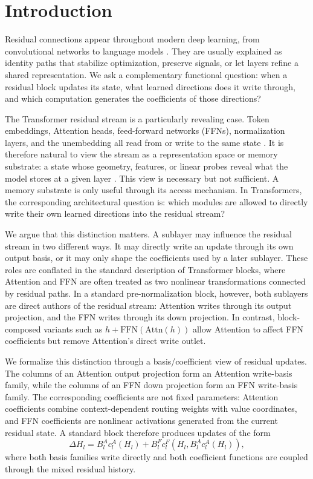 \documentclass[letterpaper]{article}
\newcommand{\Attn}{\mathrm{Attn}}
\newcommand{\FFN}{\mathrm{FFN}}
\newcommand{\BA}{B^{A}}
\newcommand{\BF}{B^{F}}
\newcommand{\ca}{c^{A}}
\newcommand{\cf}{c^{F}}
\begin{document}
\section{Introduction}

Residual connections appear throughout modern deep learning, from convolutional
networks to language models \citep{he2016identity,vaswani2017attention}. They
are usually explained as identity paths that stabilize optimization, preserve
signals, or let layers refine a shared representation. We ask a complementary
functional question: when a residual block updates its state, what learned
directions does it write through, and which computation generates the
coefficients of those directions?

The Transformer residual stream is a particularly revealing case. Token
embeddings, Attention heads, feed-forward networks (FFNs), normalization
layers, and the unembedding all read from or write to the same state
\citep{vaswani2017attention,elhage2021framework}. It is therefore natural to
view the stream as a representation space or memory substrate: a state whose
geometry, features, or linear probes reveal what the model stores at a given
layer \citep{nostalgebraist2020logit,belrose2023tuned}. This view is necessary
but not sufficient. A memory substrate is only useful through its access
mechanism. In Transformers, the corresponding architectural question is: which
modules are allowed to directly write their own learned directions into the
residual stream?

We argue that this distinction matters. A sublayer may influence the residual
stream in two different ways. It may directly write an update through its own
output basis, or it may only shape the coefficients used by a later sublayer.
These roles are conflated in the standard description of Transformer blocks,
where Attention and FFN are often treated as two nonlinear transformations
connected by residual paths. In a standard pre-normalization block, however,
both sublayers are direct authors of the residual stream: Attention writes
through its output projection, and the FFN writes through its down projection.
In contrast, block-composed variants such as $h+\FFN(\Attn(h))$ allow
Attention to affect FFN coefficients but remove Attention's direct write
outlet.

We formalize this distinction through a basis/coefficient view of residual
updates. The columns of an Attention output projection form an Attention
write-basis family, while the columns of an FFN down projection form an FFN
write-basis family. The corresponding coefficients are not fixed parameters:
Attention coefficients combine context-dependent routing weights with value
coordinates, and FFN coefficients are nonlinear activations generated from the
current residual state. A standard block therefore produces updates of the form
\begin{equation}
\Delta H_l = \BA_l \ca_l(H_l) +
             \BF_l \cf_l(H_l, \BA_l \ca_l(H_l)),
\label{eq:dual-write}
\end{equation}
where both basis families write directly and both coefficient functions are
coupled through the mixed residual history.
\end{document}
